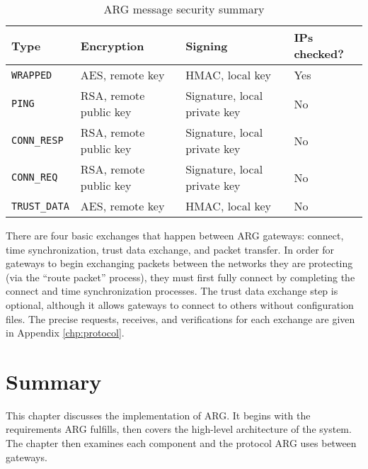 \begin{table}
\caption{\ac{ARG} message security summary}
\label{tbl:arg_protocol_security}
\centering
\begin{tabular}{llll}
\toprule
\textbf{Type} & \textbf{Encryption} & \textbf{Signing} & \textbf{\acp{IP} checked?}\\
\hline
\texttt{WRAPPED} & AES, remote key & HMAC, local key & Yes\\
\texttt{PING} & RSA, remote public key & Signature, local private key & No\\
\texttt{CONN\_RESP} & RSA, remote public key & Signature, local private key & No\\
\texttt{CONN\_REQ} & RSA, remote public key & Signature, local private key & No\\
\texttt{TRUST\_DATA} & AES, remote key & HMAC, local key & No\\
\bottomrule
\end{tabular}
\end{table}

\par There are four basic exchanges that happen between \ac{ARG} gateways: connect, time synchronization, trust data exchange, and packet transfer. In order for gateways to begin exchanging packets between the networks they are protecting (via the ``route packet'' process), they must first fully connect by completing the connect and time synchronization processes. The trust data exchange step is optional, although it allows gateways to connect to others without configuration files. The precise requests, receives, and verifications for each exchange are given in Appendix \ref{chp:protocol}.

\section{Summary}
\par This chapter discusses the implementation of \ac{ARG}. It begins with the requirements \ac{ARG} fulfills, then covers the high-level architecture of the system. The chapter then examines each component and the protocol \ac{ARG} uses between gateways.

